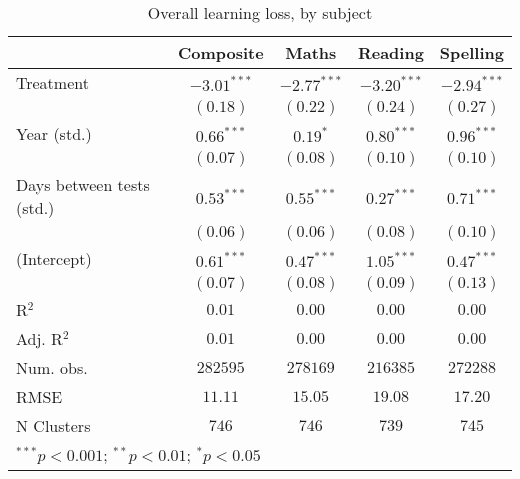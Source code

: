 
\begin{table}
\begin{center}
\begin{tabular}{l c c c c}
\hline
 & Composite & Maths & Reading & Spelling \\
\hline
Treatment                 & $-3.01^{***}$ & $-2.77^{***}$ & $-3.20^{***}$ & $-2.94^{***}$ \\
                          & $(0.18)$      & $(0.22)$      & $(0.24)$      & $(0.27)$      \\
Year (std.)               & $0.66^{***}$  & $0.19^{*}$    & $0.80^{***}$  & $0.96^{***}$  \\
                          & $(0.07)$      & $(0.08)$      & $(0.10)$      & $(0.10)$      \\
Days between tests (std.) & $0.53^{***}$  & $0.55^{***}$  & $0.27^{***}$  & $0.71^{***}$  \\
                          & $(0.06)$      & $(0.06)$      & $(0.08)$      & $(0.10)$      \\
(Intercept)               & $0.61^{***}$  & $0.47^{***}$  & $1.05^{***}$  & $0.47^{***}$  \\
                          & $(0.07)$      & $(0.08)$      & $(0.09)$      & $(0.13)$      \\
\hline
R$^2$                     & $0.01$        & $0.00$        & $0.00$        & $0.00$        \\
Adj. R$^2$                & $0.01$        & $0.00$        & $0.00$        & $0.00$        \\
Num. obs.                 & $282595$      & $278169$      & $216385$      & $272288$      \\
RMSE                      & $11.11$       & $15.05$       & $19.08$       & $17.20$       \\
N Clusters                & $746$         & $746$         & $739$         & $745$         \\
\hline
\multicolumn{5}{l}{\scriptsize{$^{***}p<0.001$; $^{**}p<0.01$; $^{*}p<0.05$}}
\end{tabular}
\caption{Overall learning loss, by subject}
\label{table:overall}
\end{center}
\end{table}
